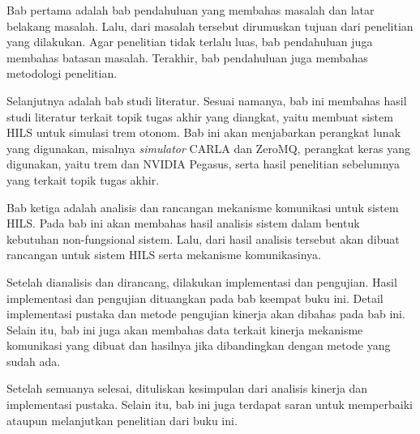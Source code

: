 Bab pertama adalah bab pendahuluan yang membahas masalah dan latar belakang
masalah. Lalu, dari masalah tersebut dirumuskan tujuan dari penelitian yang
dilakukan. Agar penelitian tidak terlalu luas, bab pendahuluan juga membahas
batasan masalah. Terakhir, bab pendahuluan juga membahas metodologi penelitian.

Selanjutnya adalah bab studi literatur. Sesuai namanya, bab ini membahas hasil
studi literatur terkait topik tugas akhir yang diangkat, yaitu membuat sistem
HILS untuk simulasi trem otonom. Bab ini akan menjabarkan perangkat lunak yang
digunakan, misalnya \textit{simulator} CARLA dan ZeroMQ, perangkat keras yang
digunakan, yaitu trem dan NVIDIA Pegasus, serta hasil penelitian sebelumnya yang
terkait topik tugas akhir.

Bab ketiga adalah analisis dan rancangan mekanisme komunikasi untuk sistem HILS.
Pada bab ini akan membahas hasil analisis sistem dalam bentuk kebutuhan
non-fungsional sistem. Lalu, dari hasil analisis tersebut akan dibuat rancangan
untuk sistem HILS serta mekanisme komunikasinya.

Setelah dianalisis dan dirancang, dilakukan implementasi dan pengujian. Hasil
implementasi dan pengujian dituangkan pada bab keempat buku ini. Detail
implementasi pustaka dan metode pengujian kinerja akan dibahas pada bab ini.
Selain itu, bab ini juga akan membahas data terkait kinerja mekanisme komunikasi
yang dibuat dan hasilnya jika dibandingkan dengan metode yang sudah ada.

Setelah semuanya selesai, dituliskan kesimpulan dari analisis kinerja dan
implementasi pustaka. Selain itu, bab ini juga terdapat saran untuk memperbaiki
ataupun melanjutkan penelitian dari buku ini.
